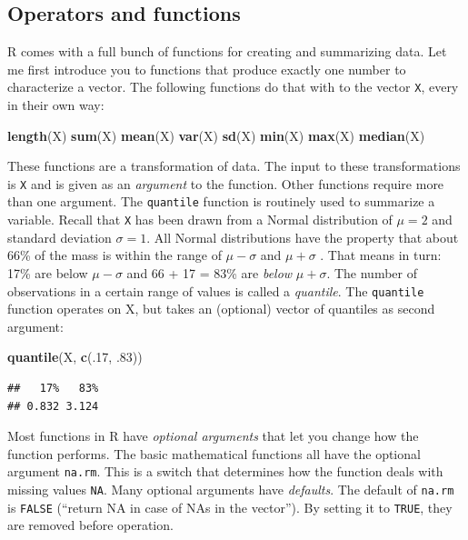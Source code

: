 \documentclass[]{svmono}
\newenvironment{Shaded}{\begin{snugshade}}{\end{snugshade}}
\newcommand{\KeywordTok}[1]{\textcolor[rgb]{0.13,0.29,0.53}{\textbf{#1}}}
\newcommand{\DecValTok}[1]{\textcolor[rgb]{0.00,0.00,0.81}{#1}}
\newcommand{\NormalTok}[1]{#1}
\theoremstyle{definition}
\theoremstyle{definition}
\theoremstyle{definition}
\theoremstyle{remark}
\begin{document}
\subsection{Operators and functions}\label{operators-and-functions}

R comes with a full bunch of functions for creating and summarizing
data. Let me first introduce you to functions that produce exactly one
number to characterize a vector. The following functions do that with to
the vector \texttt{X}, every in their own way:

\begin{Shaded}
\begin{Highlighting}[]
\KeywordTok{length}\NormalTok{(X)}
\KeywordTok{sum}\NormalTok{(X)}
\KeywordTok{mean}\NormalTok{(X)}
\KeywordTok{var}\NormalTok{(X)}
\KeywordTok{sd}\NormalTok{(X)}
\KeywordTok{min}\NormalTok{(X)}
\KeywordTok{max}\NormalTok{(X)}
\KeywordTok{median}\NormalTok{(X)}
\end{Highlighting}
\end{Shaded}

These functions are a transformation of data. The input to these
transformations is \texttt{X} and is given as an \emph{argument} to the
function. Other functions require more than one argument. The
\texttt{quantile} function is routinely used to summarize a variable.
Recall that \texttt{X} has been drawn from a Normal distribution of
\(\mu=2\) and standard deviation \(\sigma = 1\). All Normal
distributions have the property that about 66\% of the mass is within
the range of \(\mu-\sigma\) and \(\mu+\sigma\) . That means in turn:
17\% are below \(\mu-\sigma\) and 66 + 17 = 83\% are \emph{below}
\(\mu+\sigma\). The number of observations in a certain range of values
is called a \emph{quantile}. The \texttt{quantile} function operates on
X, but takes an (optional) vector of quantiles as second argument:

\begin{Shaded}
\begin{Highlighting}[]
\KeywordTok{quantile}\NormalTok{(X, }\KeywordTok{c}\NormalTok{(.}\DecValTok{17}\NormalTok{, .}\DecValTok{83}\NormalTok{))}
\end{Highlighting}
\end{Shaded}

\begin{verbatim}
##   17%   83% 
## 0.832 3.124
\end{verbatim}

Most functions in R have \emph{optional arguments} that let you change
how the function performs. The basic mathematical functions all have the
optional argument \texttt{na.rm}. This is a switch that determines how
the function deals with missing values \texttt{NA}. Many optional
arguments have \emph{defaults}. The default of \texttt{na.rm} is
\texttt{FALSE} (``return NA in case of NAs in the vector''). By setting
it to \texttt{TRUE}, they are removed before operation.
\end{document}
